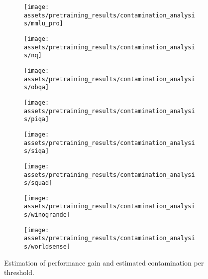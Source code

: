 \begin{figure}
\begin{subfigure}[b]{0.246\textwidth}
    \end{subfigure}
    \begin{subfigure}[b]{0.246\textwidth}
    \texttt{[image: assets/pretraining\_results/contamination\_analysis/mmlu\_pro]}
    \end{subfigure}
    \begin{subfigure}[b]{0.246\textwidth}
    \texttt{[image: assets/pretraining\_results/contamination\_analysis/nq]}
    \end{subfigure}
    \begin{subfigure}[b]{0.246\textwidth}
    \texttt{[image: assets/pretraining\_results/contamination\_analysis/obqa]}
    \end{subfigure}
    \begin{subfigure}[b]{0.246\textwidth}
    \texttt{[image: assets/pretraining\_results/contamination\_analysis/piqa]}
    \end{subfigure}
    \begin{subfigure}[b]{0.246\textwidth}
    \texttt{[image: assets/pretraining\_results/contamination\_analysis/siqa]}
    \end{subfigure}
    \begin{subfigure}[b]{0.246\textwidth}
    \texttt{[image: assets/pretraining\_results/contamination\_analysis/squad]}
    \end{subfigure}
    \begin{subfigure}[b]{0.246\textwidth}
    \texttt{[image: assets/pretraining\_results/contamination\_analysis/winogrande]}
    \end{subfigure}
    \begin{subfigure}[b]{0.246\textwidth}
    \texttt{[image: assets/pretraining\_results/contamination\_analysis/worldsense]}
    \end{subfigure}
    \caption{Estimation of performance gain and estimated contamination per threshold.}\label{figure:contamination_analysis}
\end{figure}
